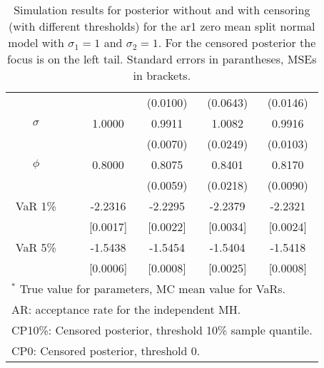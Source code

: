 {\begin{table}
\begin{tabular}{cc cccc}
&&   & (0.0100) & (0.0643) & (0.0146)  \\ 
$\sigma$&& 1.0000 & 0.9911 & 1.0082 & 0.9916  \\ 
&&   & (0.0070) & (0.0249) & (0.0103)  \\ 
$\phi$&& 0.8000 & 0.8075 & 0.8401 & 0.8170  \\ 
&&   & (0.0059) & (0.0218) & (0.0090)  \\ 
VaR 1\% && -2.2316 & -2.2295 & -2.2379 & -2.2321  \\ 
  && [0.0017] & [0.0022] & [0.0034] & [0.0024]  \\ 
VaR 5\% && -1.5438 & -1.5454 & -1.5404 & -1.5418  \\ 
 && [0.0006] & [0.0008] & [0.0025] & [0.0008]  \\ 
\hline 
\multicolumn{6}{l}{\footnotesize{$^*$ True value for parameters, MC mean value for VaRs.}}  \\ 
\multicolumn{6}{l}{\footnotesize{AR: acceptance rate for the independent MH.}}  \\ 
\multicolumn{6}{l}{\footnotesize{CP10\%: Censored posterior, threshold 10\% sample quantile.}}  \\ 
\multicolumn{6}{l}{\footnotesize{CP0: Censored posterior, threshold 0.}} 
\end{tabular}
 \caption{Simulation results for posterior without and with censoring (with different thresholds) for the ar1 zero mean split normal model with $\sigma_{1} = 1$ and $\sigma_{2} = 1$. For the censored posterior the focus is on the left tail. Standard errors in parantheses, MSEs in brackets.} 
\label{tab:ar1}  
\end{table}
}